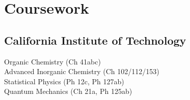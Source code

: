 \documentclass[letterpaper]{deedy-resume} %
\begin{document}
\begin{minipage}[t]{0.39\textwidth}
\section{Coursework}

\subsection{California Institute of \newline Technology}
Organic Chemistry (Ch 41abc)\\
Advanced Inorganic Chemistry (Ch 102/112/153)\\
Statistical Physics (Ph 12c, Ph 127ab)\\
Quantum Mechanics (Ch 21a, Ph 125ab)\\

\sectionspace 








\end{minipage}
\end{document}
